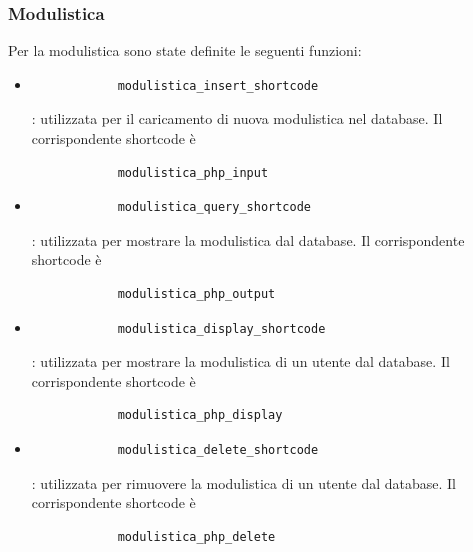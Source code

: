 \documentclass{article}
\begin{document}
		\subsubsection{\textbf{Modulistica}}
		Per la modulistica sono state definite le seguenti funzioni:
		\begin{itemize}
			\item \begin{verbatim}
			modulistica_insert_shortcode
			\end{verbatim}: utilizzata per il caricamento di nuova modulistica nel database.
			Il corrispondente shortcode è \begin{verbatim}
			modulistica_php_input
			\end{verbatim}
			\item \begin{verbatim}
			modulistica_query_shortcode
			\end{verbatim}: utilizzata per mostrare la modulistica dal database. Il corrispondente shortcode è \begin{verbatim}
			modulistica_php_output
			\end{verbatim}
			\item \begin{verbatim}
			modulistica_display_shortcode
			\end{verbatim}: utilizzata per mostrare la modulistica di un utente dal database. Il corrispondente shortcode è \begin{verbatim}
			modulistica_php_display
			\end{verbatim}
			\item \begin{verbatim}
			modulistica_delete_shortcode
			\end{verbatim}: utilizzata per rimuovere la modulistica di un utente dal database. Il corrispondente shortcode è \begin{verbatim}
			modulistica_php_delete
			\end{verbatim}
		\end{itemize}
\end{document}
